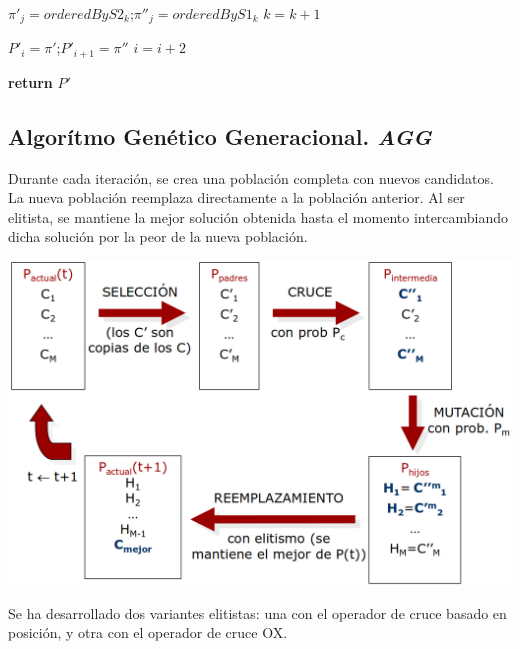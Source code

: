 \documentclass[a4paper, 12pt]{article}
\begin{document}
\begin{itemize}
\begin{algorithm}[H]
{{{         			$\pi'_j = orderedByS2_k$;\hspace*{0.5cm}$\pi''_j = orderedByS1_k$
         			$k = k+1$\\
         		}
         		
         		$P'_i = \pi'$;\hspace*{0.5cm}$P'_{i+1} = \pi''$
         		$i = i + 2$
         	}
                    
            
            \textbf{return} $P'$\\
         }
      \end{algorithm}
      	
      \end{itemize}
       
      
      \newpage
      \subsection{Algorítmo Genético Generacional. \textit{AGG}}
      Durante cada iteración, se crea una población completa con nuevos candidatos. La nueva población reemplaza directamente a la población anterior. Al ser elitista, se mantiene la mejor solución obtenida hasta el momento intercambiando dicha solución por la peor de la nueva población.\\
      
      \begin{center}
      	\includegraphics[scale=0.3]{esquema-agg}
      \end{center}
      
      
      Se ha desarrollado dos variantes elitistas: una con el operador de cruce basado en posición, y otra con el operador de cruce OX.\\
      
\end{document}
